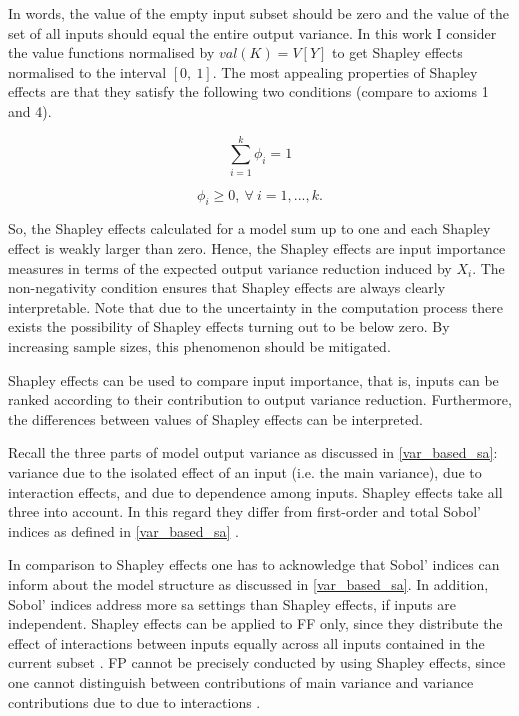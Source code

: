 In words, the value of the empty input subset should be zero and the value of the set of all inputs should equal the entire output variance. In this work I consider the value functions normalised by $val(K)=V[Y] $ to get Shapley effects normalised to the interval $ [0,\ 1] $. The most appealing properties of Shapley effects are that they satisfy the following two conditions (compare to axioms 1 and 4).

\begin{equation}
\sum_{i=1}^{k}\phi_i = 1
\end{equation}

\begin{equation}
\phi_i \geq 0,\ \forall \ i=1, ..., k.
\end{equation}

\noindent So, the Shapley effects calculated for a model sum up to one and each Shapley effect is weakly larger than zero. Hence, the Shapley effects are input importance measures in terms of the expected output variance reduction induced by $X_i$. The non-negativity condition ensures that Shapley effects are always clearly interpretable. Note that due to the uncertainty in the computation process there exists the possibility of Shapley effects turning out to be below zero. By increasing sample sizes, this phenomenon should be mitigated.

Shapley effects can be used to compare input importance, that is, inputs can be ranked according to their contribution to output variance reduction. Furthermore, the differences between values of Shapley effects can be interpreted.

Recall the three parts of model output variance as discussed in \cref{var_based_sa}: variance due to the isolated effect of an input (i.e. the main variance), due to interaction effects, and due to dependence among inputs. Shapley effects take all three into account. In this regard they differ from first-order and total Sobol' indices as defined in \cref{var_based_sa} \citep{O14}.

In comparison to Shapley effects one has to acknowledge that Sobol' indices can inform about the model structure as discussed in \cref{var_based_sa}. In addition, Sobol' indices address more sa settings than Shapley effects, if inputs are independent. Shapley effects can be applied to FF only, since they distribute the effect of interactions between inputs equally across all inputs contained in the current subset \citep{IP19}. FP cannot be precisely conducted by using Shapley effects, since one cannot distinguish between contributions of main variance and variance contributions due to due to interactions \citep{IP19}.

